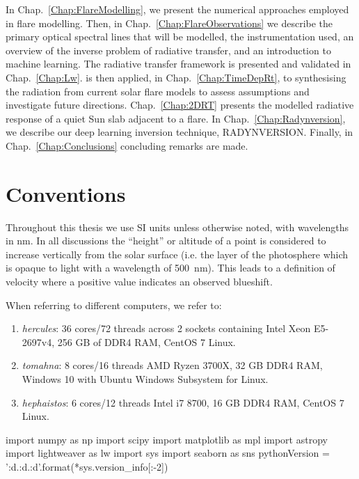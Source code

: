 In Chap.~\ref{Chap:FlareModelling}, we present the numerical approaches employed in flare modelling.
Then, in Chap.~\ref{Chap:FlareObservations} we describe the primary optical spectral lines that will be modelled, the instrumentation used, an overview of the inverse problem of radiative transfer, and an introduction to machine learning.
The \Lw{} radiative transfer framework is presented and validated in Chap.~\ref{Chap:Lw}.
\Lw{} is then applied, in Chap.~\ref{Chap:TimeDepRt}, to synthesising the radiation from current solar flare models to assess assumptions and investigate future directions.
Chap.~\ref{Chap:2DRT} presents the modelled radiative response of a quiet Sun slab adjacent to a flare.
In Chap.~\ref{Chap:Radynversion}, we describe our deep learning inversion technique, RADYNVERSION.
Finally, in Chap.~\ref{Chap:Conclusions} concluding remarks are made.


\section{Conventions}\label{Sec:Conventions}

Throughout this thesis we use SI units unless otherwise noted, with wavelengths in \si{\nano\m}.
In all discussions the ``height'' or altitude of a point is considered to increase vertically from the solar surface (i.e. the layer of the photosphere which is opaque to light with a wavelength of \SI{500}{\nano\m}).
This leads to a definition of velocity where a positive value indicates an observed blueshift.

When referring to different computers, we refer to:
\begin{enumerate}
    \item \emph{hercules}: 36 cores/72 threads across 2 sockets containing Intel Xeon E5-2697v4, 256 GB of DDR4 RAM, CentOS 7 Linux.
    \item \emph{tomahna}: 8 cores/16 threads AMD Ryzen 3700X, 32 GB DDR4 RAM, Windows 10 with Ubuntu Windows Subsystem for Linux.
    \item \emph{hephaistos}: 6 cores/12 threads Intel i7 8700, 16 GB DDR4 RAM, CentOS 7 Linux.
\end{enumerate}

\begin{pycode}[Intro]
import numpy as np
import scipy
import matplotlib as mpl
import astropy
import lightweaver as lw
import sys
import seaborn as sns
pythonVersion = '{:d}.{:d}.{:d}'.format(*sys.version_info[:-2])

\end{pycode}

